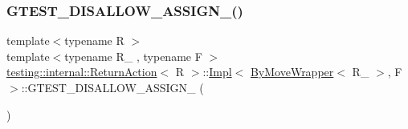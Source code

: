 \subsubsection{\texorpdfstring{GTEST\_DISALLOW\_ASSIGN\_()}{GTEST\_DISALLOW\_ASSIGN\_()}\hspace{0.1cm}{\footnotesize\ttfamily [2/3]}}
{\footnotesize\ttfamily template$<$typename R $>$ \\
template$<$typename R\+\_\+ , typename F $>$ \\
\mbox{\hyperlink{classtesting_1_1internal_1_1_return_action}{testing\+::internal\+::\+Return\+Action}}$<$ R $>$\+::\mbox{\hyperlink{classtesting_1_1internal_1_1_return_action_1_1_impl}{Impl}}$<$ \mbox{\hyperlink{structtesting_1_1internal_1_1_by_move_wrapper}{By\+Move\+Wrapper}}$<$ R\+\_\+ $>$, F $>$\+::G\+T\+E\+S\+T\+\_\+\+D\+I\+S\+A\+L\+L\+O\+W\+\_\+\+A\+S\+S\+I\+G\+N\+\_\+ (\begin{DoxyParamCaption}\item[{\mbox{\hyperlink{classtesting_1_1internal_1_1_return_action_1_1_impl}{Impl}}$<$ \mbox{\hyperlink{structtesting_1_1internal_1_1_by_move_wrapper}{By\+Move\+Wrapper}}$<$ R\+\_\+ $>$, F $>$}]{ }\end{DoxyParamCaption})\hspace{0.3cm}{\ttfamily [private]}}

\mbox{\label{classtesting_1_1internal_1_1_return_action_1_1_impl_3_01_by_move_wrapper_3_01_r___01_4_00_01_f_01_4_a989ee18a52a8bacfac5c9b6bfe82cf53}} 
